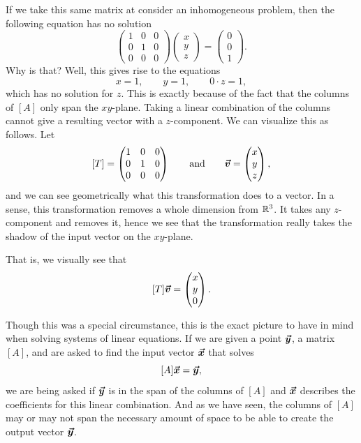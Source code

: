         If we take this same matrix at consider an inhomogeneous problem, then the following equation has no solution
        \[
        \begin{pmatrix} 1 & 0 & 0 \\ 0 & 1 & 0 \\ 0 & 0 & 0 \end{pmatrix} \begin{pmatrix} x \\ y \\ z \end{pmatrix} = \begin{pmatrix} 0 \\ 0 \\ 1 \end{pmatrix}.        
        \]
        Why is that? Well, this gives rise to the equations
        \[
        x=1,\qquad y=1, \qquad 0\cdot z = 1,
        \]
        which has no solution for $z$.  This is exactly because of the fact that the columns of $[A]$ only span the $xy$-plane.  Taking a linear combination of the columns cannot give a resulting vector with a $z$-component.  We can visualize this as follows.  Let
        \[
        [T]=\begin{pmatrix} 1 & 0 & 0 \\ 0 & 1 & 0 \\ 0 & 0 & 0 \end{pmatrix} \qquad \textrm{and} \qquad \boldsymbol{\boldsymbol{\vec{v}}} = \begin{pmatrix} x \\ y \\ z \end{pmatrix},
        \]
        and we can see geometrically what this transformation does to a vector.  In a sense, this transformation removes a whole dimension from $\mathbb{R}^3$. It takes any $z$-component and removes it, hence we see that the transformation really takes the shadow of the input vector on the $xy$-plane.
        \begin{figure}[H]
            \centering
            
        \end{figure}
        That is, we visually see that
        \[
        [T]\boldsymbol{\boldsymbol{\vec{v}}} = \begin{pmatrix} x \\ y \\ 0 \end{pmatrix}.
        \]
        
        Though this was a special circumstance, this is the exact picture to have in mind when solving systems of linear equations.  If we are given a point $\boldsymbol{\boldsymbol{\vec{y}}}$, a matrix $[A]$, and are asked to find the input vector $\boldsymbol{\boldsymbol{\vec{x}}}$ that solves
        \[
        [A]\boldsymbol{\boldsymbol{\vec{x}}} = \boldsymbol{\boldsymbol{\vec{y}}},
        \]
        we are being asked if $\boldsymbol{\boldsymbol{\vec{y}}}$ is in the span of the columns of $[A]$ and $\boldsymbol{\boldsymbol{\vec{x}}}$ describes the coefficients for this linear combination.  And as we have seen, the columns of $[A]$ may or may not span the necessary amount of space to be able to create the output vector $\boldsymbol{\boldsymbol{\vec{y}}}$.
        

